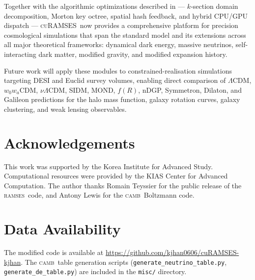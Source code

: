 \documentclass[fleqn,usenatbib]{mnras}
\newcommand{\ramses}{\textsc{ramses}}
\newcommand{\curamses}{\textsc{cuRAMSES}}
\newcommand{\camb}{\textsc{camb}}
\newcommand{\code}[1]{\texttt{#1}}
\newcommand{\fR}{f(R)}
\begin{document}
Together with the algorithmic optimizations described in
\citet{Kim2026} --- $k$-section domain decomposition, Morton key
octree, spatial hash feedback, and hybrid CPU/GPU dispatch ---
\curamses\ now provides a comprehensive platform for precision
cosmological simulations that span the standard model and its
extensions across all major theoretical frameworks: dynamical dark
energy, massive neutrinos, self-interacting dark matter, modified
gravity, and modified expansion history.

Future work will apply these modules to constrained-realisation
simulations targeting DESI and Euclid survey volumes, enabling
direct comparison of $\Lambda$CDM, $w_0w_a$CDM, $\nu\Lambda$CDM,
SIDM, MOND, $\fR$, nDGP, Symmetron, Dilaton, and Galileon
predictions for the halo mass function, galaxy rotation curves,
galaxy clustering, and weak lensing observables.


\section*{Acknowledgements}

This work was supported by the Korea Institute for Advanced Study.
Computational resources were provided by the KIAS Center for Advanced
Computation.  The author thanks Romain Teyssier for the public release
of the \ramses\ code, and Antony Lewis for the \camb\ Boltzmann code.


\section*{Data Availability}

The modified code is available at
\url{https://github.com/kjhan0606/cuRAMSES-kjhan}.  The \camb\ table
generation scripts (\code{generate\_neutrino\_table.py},
\code{generate\_de\_table.py}) are included in the \code{misc/}
directory.



\end{document}
